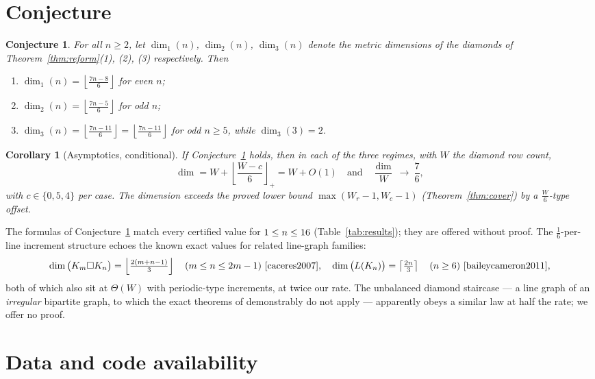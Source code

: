 \documentclass[12pt]{article}
\newtheorem{corollary}[theorem]{Corollary}
\newtheorem{conjecture}{Conjecture}
\theoremstyle{definition}
\newcommand{\floor}[1]{\left\lfloor #1 \right\rfloor}
\newcommand{\ceil}[1]{\left\lceil #1 \right\rceil}
\begin{document}
\section{Conjecture}\label{sec:conj}

\begin{conjecture}\label{conj:forms}
For all $n\ge2$, let $\dim_1(n)$, $\dim_2(n)$, $\dim_3(n)$ denote the metric dimensions of the diamonds of Theorem~\ref{thm:reform}(1), (2), (3) respectively. Then
\begin{enumerate}[label=\textup{(\roman*)},leftmargin=6mm,itemsep=2pt]
\item $\displaystyle \dim_1(n)=\floor{\tfrac{7n-8}{6}}$ for even $n$;
\item $\displaystyle \dim_2(n)=\floor{\tfrac{7n-5}{6}}$ for odd $n$;
\item $\displaystyle \dim_3(n)=\floor{\tfrac{7n-11}{6}}=\floor{\tfrac{7n-11}{6}}$ for odd $n\ge5$, while $\dim_3(3)=2$.
\end{enumerate}
\end{conjecture}

\begin{corollary}[Asymptotics, conditional]\label{cor:asymp}
If Conjecture~\ref{conj:forms} holds, then in each of the three regimes, with $W$ the diamond row count,
\[
\dim = W+\floor{\frac{W-c}{6}}_+=W+O(1)\quad\text{and}\quad \frac{\dim}{W}\ \longrightarrow\ \frac76 ,
\]
with $c\in\{0,5,4\}$ per case. The dimension exceeds the proved lower bound $\max(W_r-1,W_c-1)$ (Theorem~\ref{thm:cover}) by a $\frac W6$-type offset.
\end{corollary}

The formulas of Conjecture~\ref{conj:forms} match every certified value for $1\le n\le16$ (Table~\ref{tab:results}); they are offered without proof. The $\tfrac16$-per-line increment structure echoes the known exact values for related line-graph families:
\[
\dim\big(K_m\square K_n\big) = \floor{\tfrac{2(m+n-1)}{3}}\quad(m\le n\le 2m-1)\ \cite{caceres2007},
\quad
\dim\big(L(K_n)\big)=\ceil{\tfrac{2n}3}\quad(n\ge6)\ \cite{baileycameron2011},
\]
both of which also sit at $\Theta(W)$ with periodic-type increments, at twice our rate. The unbalanced diamond staircase --- a line graph of an \emph{irregular} bipartite graph, to which the exact theorems of \cite{caceres2007,baileycameron2011} demonstrably do not apply --- apparently obeys a similar law at half the rate; we offer no proof.

\section{Data and code availability}\label{sec:artefacts}
\end{document}
